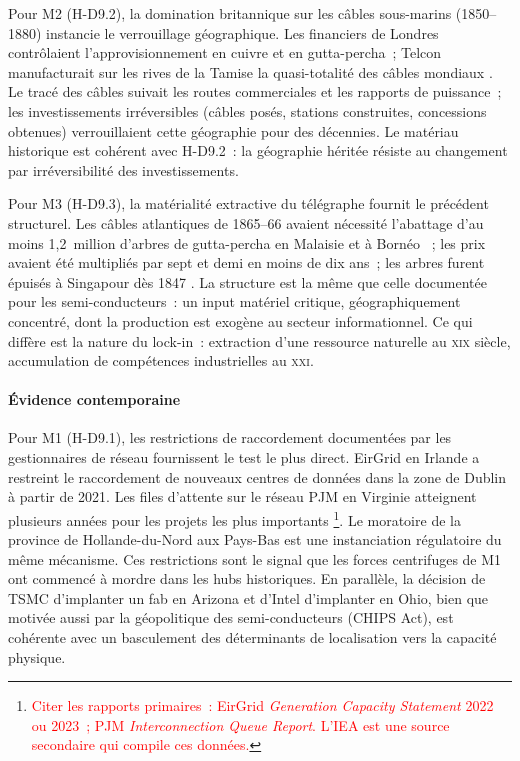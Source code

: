 Pour M2 (H-D9.2), la domination britannique sur les câbles sous-marins (1850--1880) instancie le verrouillage géographique. Les financiers de Londres contrôlaient l'approvisionnement en cuivre et en gutta-percha~; Telcon manufacturait sur les rives de la Tamise la quasi-totalité des câbles mondiaux \parencite{muller_telegraph_2015}. Le tracé des câbles suivait les routes commerciales et les rapports de puissance~; les investissements irréversibles (câbles posés, stations construites, concessions obtenues) verrouillaient cette géographie pour des décennies. Le matériau historique est cohérent avec H-D9.2~: la géographie héritée résiste au changement par irréversibilité des investissements.

Pour M3 (H-D9.3), la matérialité extractive du télégraphe fournit le précédent structurel. Les câbles atlantiques de 1865--66 avaient nécessité l'abattage d'au moins 1,2~million d'arbres de gutta-percha en Malaisie et à Bornéo \parencite{tully_victorian_2009}~; les prix avaient été multipliés par sept et demi en moins de dix ans~; les arbres furent épuisés à Singapour dès 1847 \parencite{sanzo_around_2023}. La structure est la même que celle documentée pour les semi-conducteurs~: un input matériel critique, géographiquement concentré, dont la production est exogène au secteur informationnel. Ce qui diffère est la nature du lock-in~: extraction d'une ressource naturelle au \textsc{xix}\ieme{} siècle, accumulation de compétences industrielles au \textsc{xxi}\ieme{}.


\paragraph{Évidence contemporaine}

Pour M1 (H-D9.1), les restrictions de raccordement documentées par les gestionnaires de réseau fournissent le test le plus direct. EirGrid en Irlande a restreint le raccordement de nouveaux centres de données dans la zone de Dublin à partir de 2021. Les files d'attente sur le réseau PJM en Virginie atteignent plusieurs années pour les projets les plus importants \parencite{iea_energy_ai_2025}\footnote{\textcolor{red}{Citer les rapports primaires~: EirGrid \emph{Generation Capacity Statement} 2022 ou 2023~; PJM \emph{Interconnection Queue Report}. L'IEA est une source secondaire qui compile ces données.}}. Le moratoire de la province de Hollande-du-Nord aux Pays-Bas est une instanciation régulatoire du même mécanisme. Ces restrictions sont le signal que les forces centrifuges de M1 ont commencé à mordre dans les hubs historiques. En parallèle, la décision de TSMC d'implanter un fab en Arizona et d'Intel d'implanter en Ohio, bien que motivée aussi par la géopolitique des semi-conducteurs (CHIPS Act), est cohérente avec un basculement des déterminants de localisation vers la capacité physique.

